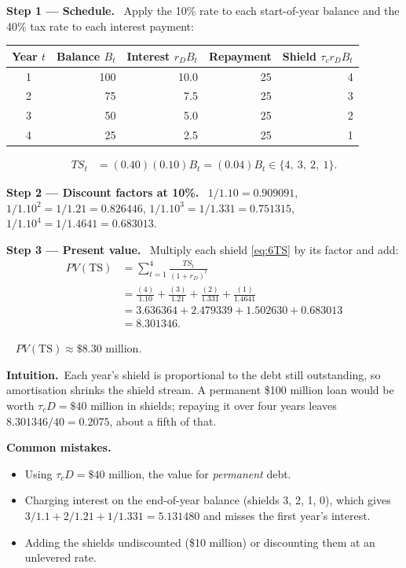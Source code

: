 \documentclass[11pt,a4paper]{article}
\numberwithin{equation}{section}
\newcommand{\step}[2]{\par\smallskip\noindent\textbf{Step #1 --- #2.}~}
\newcommand{\intuition}{\par\smallskip\noindent\textbf{Intuition.}~}
\newcommand{\answer}[1]{\par\smallskip\noindent\fbox{\textbf{Answer #1.}}~}
\newcommand{\pitfalls}{\par\medskip\noindent\textbf{Common mistakes.}}
\begin{document}
\step{1}{Schedule} Apply the 10\% rate to each start-of-year balance and the 40\% tax rate to
each interest payment:
\begin{center}
\begin{tabular}{crrrr}
\toprule
Year $t$ & Balance $B_t$ & Interest $r_D B_t$ & Repayment & Shield $\tau_c r_D B_t$\\
\midrule
1 & 100 & 10.0 & 25 & 4\\
2 &  75 &  7.5 & 25 & 3\\
3 &  50 &  5.0 & 25 & 2\\
4 &  25 &  2.5 & 25 & 1\\
\bottomrule
\end{tabular}
\end{center}
\begin{align}
  \mathit{TS}_t &= (0.40)(0.10)B_t = (0.04)B_t \in \{4,\ 3,\ 2,\ 1\}. \label{eq:6TS}
\end{align}

\step{2}{Discount factors at 10\%}
$1/1.10=0.909091$, $1/1.10^2=1/1.21=0.826446$, $1/1.10^3=1/1.331=0.751315$,
$1/1.10^4=1/1.4641=0.683013$.

\step{3}{Present value} Multiply each shield \eqref{eq:6TS} by its factor and add:
\begin{align}
  \mathit{PV}(\text{TS}) &= \sum_{t=1}^{4}\frac{\mathit{TS}_t}{(1+r_D)^t} \label{eq:6PV}\\
      &= \frac{(4)}{1.10}+\frac{(3)}{1.21}+\frac{(2)}{1.331}+\frac{(1)}{1.4641} \nonumber\\
      &= 3.636364+2.479339+1.502630+0.683013 \nonumber\\
      &= 8.301346. \nonumber
\end{align}
\answer{(PV of the shields)} $\mathit{PV}(\text{TS})\approx\$8.30$ million.

\intuition Each year's shield is proportional to the debt still outstanding, so amortisation
shrinks the shield stream. A permanent \$100 million loan would be worth $\tau_c D=\$40$
million in shields; repaying it over four years leaves $8.301346/40=0.2075$, about a fifth of
that.

\pitfalls
\begin{itemize}
  \item Using $\tau_c D=\$40$ million, the value for \emph{permanent} debt.
  \item Charging interest on the end-of-year balance (shields 3, 2, 1, 0), which gives
        $3/1.1+2/1.21+1/1.331=5.131480$ and misses the first year's interest.
  \item Adding the shields undiscounted (\$10 million) or discounting them at an unlevered rate.
\end{itemize}
\end{document}
